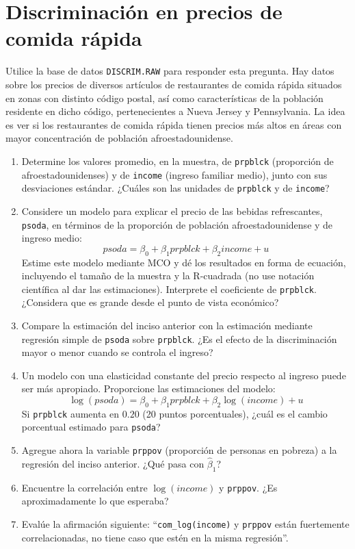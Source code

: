 \documentclass[12pt]{article}
\begin{document}
\section{Discriminación en precios de comida rápida}

Utilice la base de datos \texttt{DISCRIM.RAW} para responder esta pregunta. Hay datos sobre los precios de diversos artículos de restaurantes de comida rápida situados en zonas con distinto código postal, así como características de la población residente en dicho código, pertenecientes a Nueva Jersey y Pennsylvania. La idea es ver si los restaurantes de comida rápida tienen precios más altos en áreas con mayor concentración de población afroestadounidense.

\begin{enumerate}[label=\textbf{\alph*)}]
    \item Determine los valores promedio, en la muestra, de \texttt{prpblck} (proporción de afroestadounidenses) y de \texttt{income} (ingreso familiar medio), junto con sus desviaciones estándar. ¿Cuáles son las unidades de \texttt{prpblck} y de \texttt{income}?
    
    \item Considere un modelo para explicar el precio de las bebidas refrescantes, \texttt{psoda}, en términos de la proporción de población afroestadounidense y de ingreso medio:
    \[
        psoda = \beta_0 + \beta_1 prpblck + \beta_2 income + u
    \]
    Estime este modelo mediante MCO y dé los resultados en forma de ecuación, incluyendo el tamaño de la muestra y la R-cuadrada (no use notación científica al dar las estimaciones). Interprete el coeficiente de \texttt{prpblck}. ¿Considera que es grande desde el punto de vista económico?

    \item Compare la estimación del inciso anterior con la estimación mediante regresión simple de \texttt{psoda} sobre \texttt{prpblck}. ¿Es el efecto de la discriminación mayor o menor cuando se controla el ingreso?

    \item Un modelo con una elasticidad constante del precio respecto al ingreso puede ser más apropiado. Proporcione las estimaciones del modelo:
    \[
        \log(psoda) = \beta_0 + \beta_1 prpblck + \beta_2 \log(income) + u
    \]
    Si \texttt{prpblck} aumenta en $0.20$ (20 puntos porcentuales), ¿cuál es el cambio porcentual estimado para \texttt{psoda}?

    \item Agregue ahora la variable \texttt{prppov} (proporción de personas en pobreza) a la regresión del inciso anterior. ¿Qué pasa con $\hat{\beta}_1$?

    \item Encuentre la correlación entre $\log(income)$ y \texttt{prppov}. ¿Es aproximadamente lo que esperaba?

    \item Evalúe la afirmación siguiente: “\texttt{com\_log(income)} y \texttt{prppov} están fuertemente correlacionadas, no tiene caso que estén en la misma regresión”.
\end{enumerate}
\end{document}
